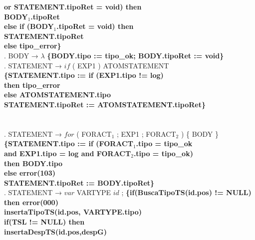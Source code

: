 \begin{tabbing}
    \>                    \>           \>\textbf{or STATEMENT.tipoRet = void) then}\\
    \>                    \>           \>          \>\textbf{BODY$_1$.tipoRet}\\
    \>                    \>           \>\textbf{else if (BODY$_1$.tipoRet = void) then}\\
    \>                    \>           \>          \>\textbf{STATEMENT.tipoRet}\\
    \>                    \>           \>\textbf{else tipo\_error\}}\\
    . BODY → $\lambda$ \textbf{\{BODY.tipo := tipo\_ok; BODY.tipoRet := void\}}\\
    . STATEMENT → $if$ ( EXP1 ) ATOMSTATEMENT\\
    \>                    \> \textbf{\{STATEMENT.tipo := if (EXP1.tipo != log)}\\
    \>                    \> \> \>\textbf{then tipo\_error}\\
    \>                    \> \> \textbf{else ATOMSTATEMENT.tipo}\\
    \>                    \> \textbf{STATEMENT.tipoRet := ATOMSTATEMENT.tipoRet\}}\\
    \\
    \\
    . STATEMENT → $for$ ( FORACT$_1$ ; EXP1 ; FORACT$_2$ ) \{ BODY \}\\
    \>                    \> \textbf{\{STATEMENT.tipo := if (FORACT$_1$.tipo = tipo\_ok}\\
    \>                    \> \>\textbf{and EXP1.tipo = log and FORACT$_2$.tipo = tipo\_ok)}\\
    \>                    \> \> \>\textbf{then BODY.tipo}\\
    \>                    \> \>\textbf{else error(103)}\\
    \>                    \> \textbf{STATEMENT.tipoRet := BODY.tipoRet\}}\\
    . STATEMENT → $var$ VARTYPE $id$ ; \textbf{\{if(BuscaTipoTS(id.pos) != NULL)} \\
    \>              \>          \>
    \>\textbf{then error(000)}\\
    \>                    \> \textbf{insertaTipoTS(id.pos, VARTYPE.tipo)}\\
    \>                    \> \textbf{if(TSL != NULL) then }\\
    \>                    \> \> \textbf{insertaDespTS(id.pos,despG)}\\

\end{tabbing}
